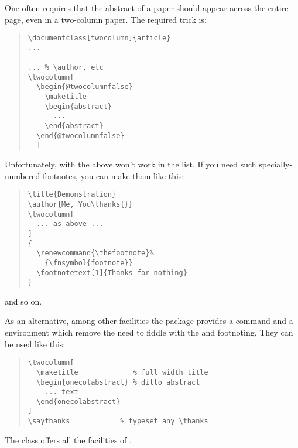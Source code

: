 One often requires that the abstract of a paper should appear across
the entire page, even in a two-column paper.  The required trick is:
\begin{quote}
\begin{verbatim}
\documentclass[twocolumn]{article}
...

... % \author, etc
\twocolumn[
  \begin{@twocolumnfalse}
    \maketitle
    \begin{abstract}
      ...
    \end{abstract}
  \end{@twocolumnfalse}
  ]
\end{verbatim}
\end{quote}
Unfortunately, with the above  won't work in the
 list.  If you need such specially-numbered footnotes, you
can make them like this:
\begin{quote}
\begin{verbatim}
\title{Demonstration}
\author{Me, You\thanks{}}
\twocolumn[
  ... as above ...
]
{
  \renewcommand{\thefootnote}%
    {\fnsymbol{footnote}}
  \footnotetext[1]{Thanks for nothing}
}
\end{verbatim}
\end{quote}
and so on.

As an alternative, among other facilities the  package 
provides a
 command and a  environment
which remove the need to fiddle with the  and
footnoting. They can be used like this:
\begin{quote}
\begin{verbatim}
\twocolumn[
  \maketitle             % full width title
  \begin{onecolabstract} % ditto abstract
    ... text
  \end{onecolabstract}
]
\saythanks            % typeset any \thanks
\end{verbatim}
\end{quote}
The  class offers all the facilities of .
\begin{ctanrefs}
\item[abstract.sty]
\item[memoir.cls]
\end{ctanrefs}

